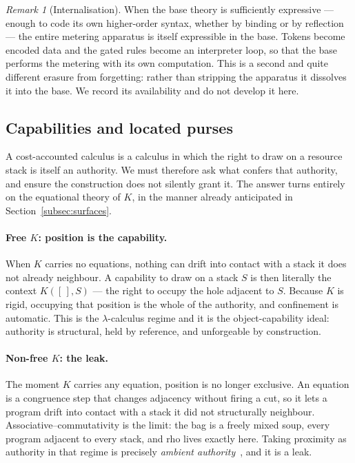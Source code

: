 \documentclass[11pt]{article}
\theoremstyle{definition}
\theoremstyle{plain}
\theoremstyle{remark}
\newtheorem{remark}[definition]{Remark}
\begin{document}
\begin{remark}[Internalisation]
\label{rem:internalise-cost}
When the base theory is sufficiently expressive --- enough to code its own higher-order
syntax, whether by binding or by reflection --- the entire metering apparatus is itself
expressible in the base. Tokens become encoded data and the gated rules become an
interpreter loop, so that the base performs the metering with its own computation. This
is a second and quite different erasure from forgetting: rather than stripping the
apparatus it dissolves it into the base. We record its availability and do not develop
it here.
\end{remark}

\subsection{Capabilities and located purses}
\label{subsec:capabilities}

A cost-accounted calculus is a calculus in which the right to draw on a resource stack is
itself an authority. We must therefore ask what confers that authority, and ensure the
construction does not silently grant it. The answer turns entirely on the equational
theory of $K$, in the manner already anticipated in Section~\ref{subsec:surfaces}.

\paragraph{Free $K$: position is the capability.} When $K$ carries no equations, nothing
can drift into contact with a stack it does not already neighbour. A capability to draw
on a stack $S$ is then literally the context $K([\,], S)$ --- the right to occupy the hole
adjacent to $S$. Because $K$ is rigid, occupying that position is the whole of the
authority, and confinement is automatic. This is the $\lambda$-calculus regime and it is
the object-capability ideal: authority is structural, held by reference, and unforgeable
by construction.

\paragraph{Non-free $K$: the leak.} The moment $K$ carries any equation, position is no
longer exclusive. An equation is a congruence step that changes adjacency without firing
a cut, so it lets a program drift into contact with a stack it did not structurally
neighbour. Associative--commutativity is the limit: the bag is a freely mixed soup, every
program adjacent to every stack, and rho lives exactly here. Taking proximity as
authority in that regime is precisely \emph{ambient authority}~\cite{MillerYeeShapiro2003},
and it is a leak.
\end{document}
